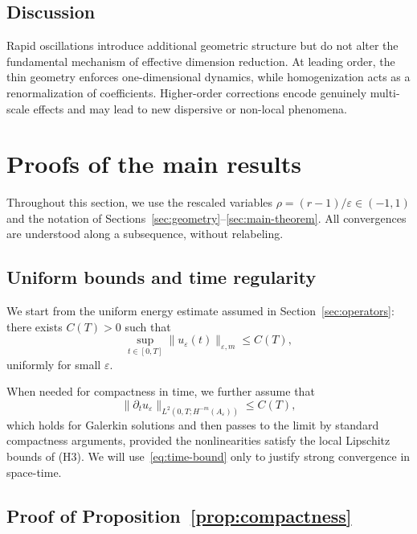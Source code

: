 \documentclass[11pt]{amsart}
\theoremstyle{plain}
\theoremstyle{definition}
\theoremstyle{remark}
\theoremstyle{remark}
\begin{document}
\subsection{Discussion}

Rapid oscillations introduce additional geometric structure but do not alter the
fundamental mechanism of effective dimension reduction.
At leading order, the thin geometry enforces one-dimensional dynamics, while
homogenization acts as a renormalization of coefficients.
Higher-order corrections encode genuinely multi-scale effects and may lead to
new dispersive or non-local phenomena.


\section{Proofs of the main results}
\label{sec:proofs}

Throughout this section, we use the rescaled variables
\(
\rho=(r-1)/\varepsilon\in(-1,1)
\)
and the notation of Sections~\ref{sec:geometry}--\ref{sec:main-theorem}.
All convergences are understood along a subsequence, without relabeling.

\subsection{Uniform bounds and time regularity}

We start from the uniform energy estimate assumed in Section~\ref{sec:operators}:
there exists \(C(T)>0\) such that
\begin{equation}
\label{eq:unif-bound-proof}
\sup_{t\in[0,T]}\|u_\varepsilon(t)\|_{\varepsilon,m}\le C(T),
\end{equation}
uniformly for small \(\varepsilon\).

When needed for compactness in time, we further assume that
\begin{equation}
\label{eq:time-bound}
\|\partial_t u_\varepsilon\|_{L^2(0,T;H^{-m}(A_\varepsilon))}\le C(T),
\end{equation}
which holds for Galerkin solutions and then passes to the limit by standard
compactness arguments, provided the nonlinearities satisfy the local
Lipschitz bounds of (H3).
We will use~\eqref{eq:time-bound} only to justify strong convergence in space-time.

\subsection{Proof of Proposition~\ref{prop:compactness}}
\label{subsec:proof-compactness}
\end{document}
